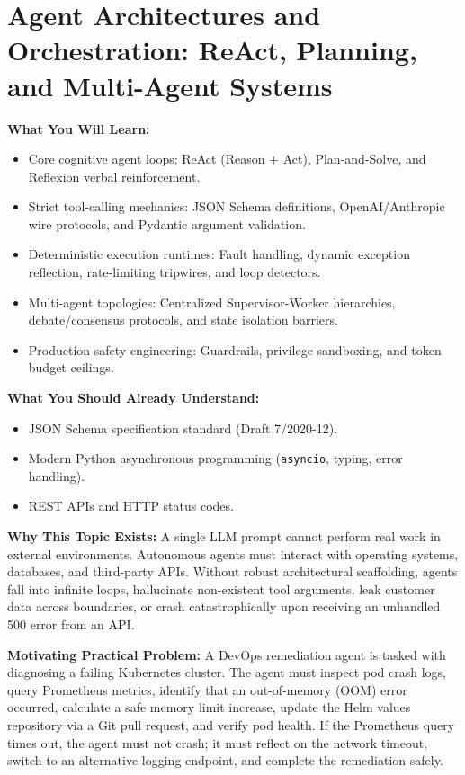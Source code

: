 \chapter{Agent Architectures and Orchestration: ReAct, Planning, and Multi-Agent Systems}
\label{ch:agent_architectures}

\begin{chaptergoalsbox}
\textbf{What You Will Learn:}
\begin{itemize}[leftmargin=15pt]
  \item Core cognitive agent loops: ReAct (Reason + Act), Plan-and-Solve, and Reflexion verbal reinforcement.
  \item Strict tool-calling mechanics: JSON Schema definitions, OpenAI/Anthropic wire protocols, and Pydantic argument validation.
  \item Deterministic execution runtimes: Fault handling, dynamic exception reflection, rate-limiting tripwires, and loop detectors.
  \item Multi-agent topologies: Centralized Supervisor-Worker hierarchies, debate/consensus protocols, and state isolation barriers.
  \item Production safety engineering: Guardrails, privilege sandboxing, and token budget ceilings.
\end{itemize}

\textbf{What You Should Already Understand:}
\begin{itemize}[leftmargin=15pt]
  \item JSON Schema specification standard (Draft 7/2020-12).
  \item Modern Python asynchronous programming (\texttt{asyncio}, typing, error handling).
  \item REST APIs and HTTP status codes.
\end{itemize}

\textbf{Why This Topic Exists:}
A single LLM prompt cannot perform real work in external environments. Autonomous agents must interact with operating systems, databases, and third-party APIs. Without robust architectural scaffolding, agents fall into infinite loops, hallucinate non-existent tool arguments, leak customer data across boundaries, or crash catastrophically upon receiving an unhandled 500 error from an API.

\textbf{Motivating Practical Problem:}
A DevOps remediation agent is tasked with diagnosing a failing Kubernetes cluster. The agent must inspect pod crash logs, query Prometheus metrics, identify that an out-of-memory (OOM) error occurred, calculate a safe memory limit increase, update the Helm values repository via a Git pull request, and verify pod health. If the Prometheus query times out, the agent must not crash; it must reflect on the network timeout, switch to an alternative logging endpoint, and complete the remediation safely.
\end{chaptergoalsbox}

